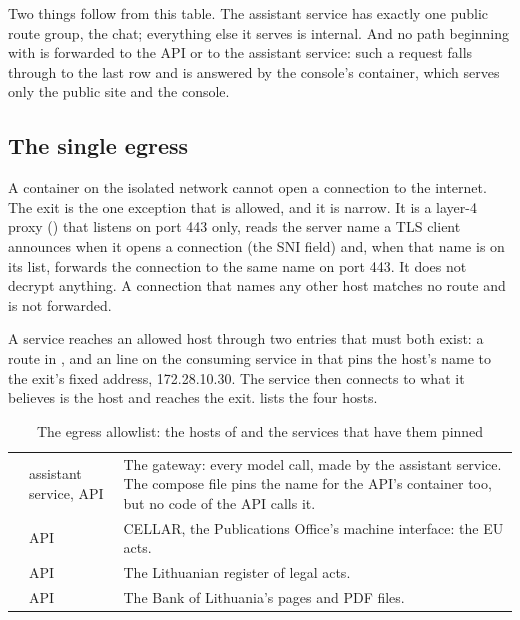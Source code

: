 Two things follow from this table. The assistant service has exactly one public route group,
the chat; everything else it serves is internal. And no path beginning with 
is forwarded to the API or to the assistant service: such a request falls through to the last
row and is answered by the console's container, which serves only the public site and the
console.

\subsection{The single egress}

A container on the isolated network cannot open a connection to the internet. The exit is
the one exception that is allowed, and it is narrow. It is a layer-4 proxy
() that listens on port 443 only, reads the server name a TLS client
announces when it opens a connection (the SNI field) and, when that name is on its list,
forwards the connection to the same name on port 443. It does not decrypt anything. A
connection that names any other host matches no route and is not forwarded.

A service reaches an allowed host through two entries that must both exist: a route in
, and an  line on the consuming service in
 that pins the host's name to the exit's fixed address,
172.28.10.30. The service then connects to what it believes is the host and reaches the exit.
 lists the four hosts.

\begin{table}[H]
\caption{The egress allowlist: the hosts of  and the services that have
  them pinned}\label{tab:arch:egress}
\begin{tabularx}{\textwidth}{@{}L{38mm}L{30mm}Y@{}}
\toprule
{} &  &  \\
\midrule
{} & assistant service, API & The gateway: every model call, made by the assistant service. The compose file pins the name for the API's container too, but no code of the API calls it. \\
 & API & CELLAR, the Publications Office's machine interface: the EU acts. \\
 & API & The Lithuanian register of legal acts. \\
 & API & The Bank of Lithuania's pages and PDF files. \\
\bottomrule
\end{tabularx}
\end{table}

